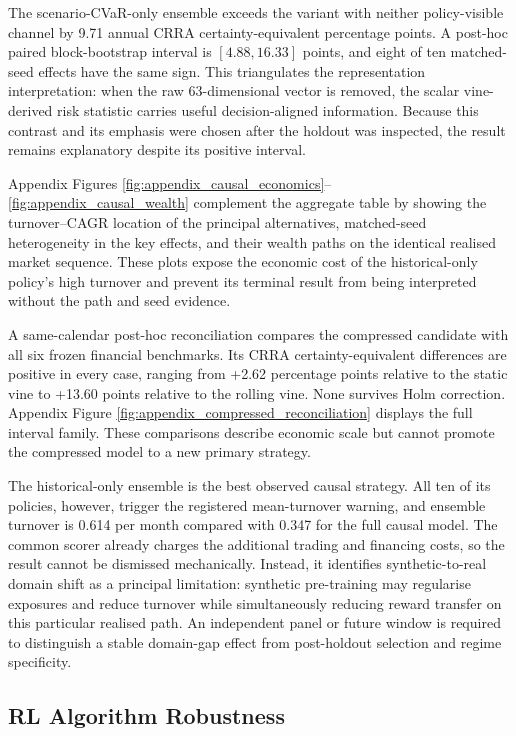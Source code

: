 The scenario-CVaR-only ensemble exceeds the variant with neither policy-visible channel by 9.71 annual CRRA certainty-equivalent percentage points. A post-hoc paired block-bootstrap interval is $[4.88,16.33]$ points, and eight of ten matched-seed effects have the same sign. This triangulates the representation interpretation: when the raw 63-dimensional vector is removed, the scalar vine-derived risk statistic carries useful decision-aligned information. Because this contrast and its emphasis were chosen after the holdout was inspected, the result remains explanatory despite its positive interval.

Appendix Figures \ref{fig:appendix_causal_economics}--\ref{fig:appendix_causal_wealth} complement the aggregate table by showing the turnover--CAGR location of the principal alternatives, matched-seed heterogeneity in the key effects, and their wealth paths on the identical realised market sequence. These plots expose the economic cost of the historical-only policy's high turnover and prevent its terminal result from being interpreted without the path and seed evidence.

A same-calendar post-hoc reconciliation compares the compressed candidate with all six frozen financial benchmarks. Its CRRA certainty-equivalent differences are positive in every case, ranging from +2.62 percentage points relative to the static vine to +13.60 points relative to the rolling vine. None survives Holm correction. Appendix Figure \ref{fig:appendix_compressed_reconciliation} displays the full interval family. These comparisons describe economic scale but cannot promote the compressed model to a new primary strategy.

The historical-only ensemble is the best observed causal strategy. All ten of its policies, however, trigger the registered mean-turnover warning, and ensemble turnover is 0.614 per month compared with 0.347 for the full causal model. The common scorer already charges the additional trading and financing costs, so the result cannot be dismissed mechanically. Instead, it identifies synthetic-to-real domain shift as a principal limitation: synthetic pre-training may regularise exposures and reduce turnover while simultaneously reducing reward transfer on this particular realised path. An independent panel or future window is required to distinguish a stable domain-gap effect from post-holdout selection and regime specificity.

\subsection{RL Algorithm Robustness}
\label{subsec:4_algorithm_robustness}

